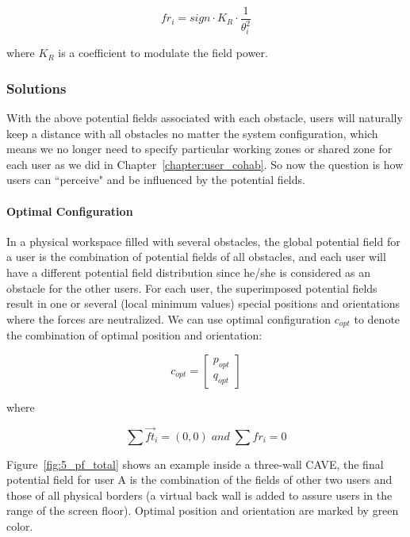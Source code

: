 \begin{equation}
{fr}_{i}=sign \cdot K_{R} \cdot \frac{1}{\theta_{i}^2}
\end{equation}

where $K_{R}$ is a coefficient to modulate the field power.

\subsubsection{Solutions}
\label{sec:5_solution}

With the above potential fields associated with each obstacle, users will naturally keep a distance with all obstacles no matter the system configuration, which means we no longer need to specify particular working zones or shared zone for each user as we did in Chapter~\ref{chapter:user_cohab}. So now the question is how users can ``perceive" and be influenced by the potential fields.

\paragraph{Optimal Configuration} In a physical workspace filled with several obstacles, the global potential field for a user is the combination of potential fields of all obstacles, and each user will have a different potential field distribution since he/she is considered as an obstacle for the other users. For each user, the superimposed potential fields result in one or several (local minimum values) special positions and orientations where the forces are neutralized. We can use optimal configuration $c_{opt}$ to denote the combination of optimal position and orientation:

\begin{equation}
c_{opt}=
\begin{bmatrix}
p_{opt} \\ q_{opt}
\end{bmatrix}
\end{equation}

where

\begin{equation}
\sum \overrightarrow{ft}_{i}=(0, 0)\; and\; \sum fr_{i}=0
\end{equation}


Figure~\ref{fig:5_pf_total} shows an example inside a three-wall CAVE, the final potential field for user A is the combination of the fields of other two users and those of all physical borders (a virtual back wall is added to assure users in the range of the screen floor). Optimal position and orientation are marked by green color.

